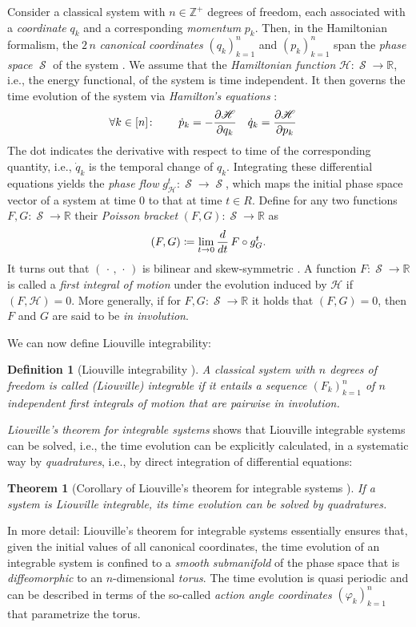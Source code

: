 \documentclass[a4paper,12pt,listof=totoc,index=totoc,bibliography=totoc,headsepline=false,headings=normal,BCOR16.153846mm,DIV12,headinclude,twoside,cleardoublepage=empty,numbers=noenddot,final]{scrreprt}
\theoremstyle{mystyle}
\numberwithin{equation}{section}
\numberwithin{figure}{section}
\numberwithin{lemma}{section}
\newtheorem{theorem}{Theorem}
\numberwithin{theorem}{section}
\numberwithin{corollary}{section}
\newtheorem{definition}{Definition}
\numberwithin{definition}{section}
\numberwithin{conjecture}{section}
\numberwithin{observation}{section}
\newcommand{\+}{\mkern2mu}
\newcommand{\coloneqq}{\mathrel{\vcentcolon\mkern-1.2mu=}} %
\newcommand{\argdot}{{\,\cdot\,}}
\newcommand{\oftype}{\colon}
\newcommand{\itholds}{\colon\mathchoice{\quad}{}{}{}}
\newcommand{\CH}{\mathscr{H}}
\newcommand{\del}{\mathop{}\!\partial}
\newcommand{\ddel}{\mathop{}\!d}
\DeclareMathOperator{\1}{\mathds{1}}
\DeclareMathOperator{\Cst}{\mathscr{S}}
\newcommand{\mb}[1]{\mathbb{#1}}
\newcommand{\Z}{\mb{Z}}
\newcommand{\R}{\mb{R}}
\begin{document}
Consider a classical system with $n \in \Z^+$ degrees of freedom, each associated with a \emph{coordinate} $q_k$ and a corresponding \emph{momentum} $p_k$.
Then, in the Hamiltonian formalism, the $2\,n$ \emph{canonical coordinates} $(q_k)_{k=1}^n$ and $(p_k)_{k=1}^n$ span the \emph{phase space} $\Cst $ of the system \cite{Kinchin1949}.
We assume that the \emph{Hamiltonian function} $\CH\oftype\Cst\to\R$, i.e., the energy functional, of the system is time independent.
It then governs the time evolution of the system via \emph{Hamilton's equations} \cite{Arnold78}:
\begin{align}
  &\forall k\in[n]\itholds &\dot p_k &= - \frac{\del\CH}{\del q_k} &  \dot q_k &= \frac{\del\CH}{\del p_k}
\end{align}
The dot indicates the derivative with respect to time of the corresponding quantity, i.e., $\dot q_k$ is the temporal change of $q_k$.
Integrating these differential equations yields the \emph{phase flow} $g_\CH^t\oftype\Cst \to \Cst$, which maps the initial phase space vector of a system at time $0$ to that at time $t \in R$.
Define for any two functions $F,G\oftype\Cst\to\R$ their \emph{Poisson bracket} $(F,G)\oftype\Cst\to\R$ as
\begin{equation}
  (F,G) \coloneqq \lim_{t\to0} \frac{\ddel}{\ddel t}\, F \circ g_G^t .
\end{equation}
It turns out that $(\argdot,\argdot)$ is bilinear and skew-symmetric \cite{Arnold78}.
A function $F\oftype\Cst\to\R$ is called a \emph{first integral of motion} under the evolution induced by $\CH$ if $(F,\CH) = 0$.
More generally, if for $F,G\oftype\Cst\to\R$ it holds that $(F,G) = 0$, then $F$ and $G$ are said to be \emph{in involution}.

We can now define Liouville integrability:
\begin{definition}[Liouville integrability \cite{Arnold78}]
  A classical system with $n$ degrees of freedom is called (Liouville) integrable if it entails a sequence $(F_k)_{k=1}^{n}$ of $n$ independent first integrals of motion that are pairwise in involution.
\end{definition}
\emph{Liouville's theorem for integrable systems} shows that Liouville integrable systems can be solved, i.e., the time evolution can be explicitly calculated, in a systematic way by \emph{quadratures}, i.e., by direct integration of differential equations:
\begin{theorem}[Corollary of Liouville's theorem for integrable systems \cite{Arnold78}]
  If a system is Liouville integrable, its time evolution can be solved by quadratures.
\end{theorem}
In more detail: Liouville's theorem for integrable systems essentially ensures that, given the initial values of all canonical coordinates, the time evolution of an integrable system is confined to a \emph{smooth} \emph{submanifold} of the phase space that is \emph{diffeomorphic} to an $n$-dimensional \emph{torus}.
The time evolution is quasi periodic and can be described in terms of the so-called \emph{action angle coordinates} $(\varphi_k)_{k=1}^n$ that parametrize the torus.
\end{document}
